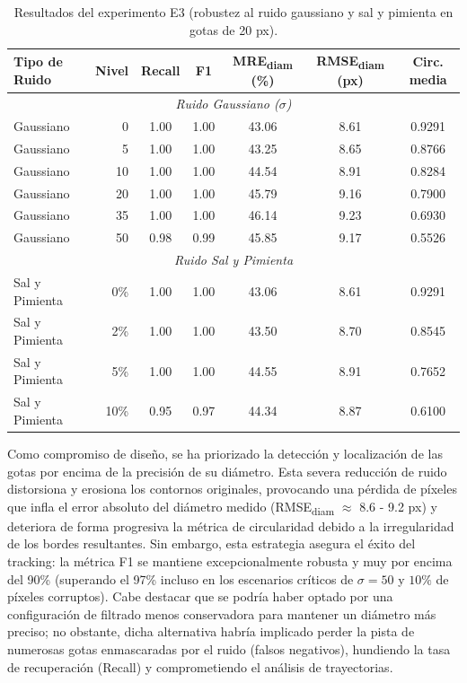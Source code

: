 \begin{table}[H]
\centering
\small
\caption{Resultados del experimento E3 (robustez al ruido gaussiano y sal y pimienta en gotas de 20 px).}
\begin{tabular}{lrccccc}
\hline
\textbf{Tipo de Ruido} & \textbf{Nivel} & \textbf{Recall} & \textbf{F1} & \textbf{MRE\textsubscript{diam} (\%)} & \textbf{RMSE\textsubscript{diam} (px)} & \textbf{Circ. media} \\
\hline
\multicolumn{7}{c}{\textit{Ruido Gaussiano ($\sigma$)}} \\
\hline
Gaussiano & 0  & 1.00 & 1.00 & 43.06 & 8.61 & 0.9291 \\
Gaussiano & 5  & 1.00 & 1.00 & 43.25 & 8.65 & 0.8766 \\
Gaussiano & 10 & 1.00 & 1.00 & 44.54 & 8.91 & 0.8284 \\
Gaussiano & 20 & 1.00 & 1.00 & 45.79 & 9.16 & 0.7900 \\
Gaussiano & 35 & 1.00 & 1.00 & 46.14 & 9.23 & 0.6930 \\
Gaussiano & 50 & 0.98 & 0.99 & 45.85 & 9.17 & 0.5526 \\
\hline
\multicolumn{7}{c}{\textit{Ruido Sal y Pimienta}} \\
\hline
Sal y Pimienta & 0\%  & 1.00 & 1.00 & 43.06 & 8.61 & 0.9291 \\
Sal y Pimienta & 2\%  & 1.00 & 1.00 & 43.50 & 8.70 & 0.8545 \\
Sal y Pimienta & 5\%  & 1.00 & 1.00 & 44.55 & 8.91 & 0.7652 \\
Sal y Pimienta & 10\% & 0.95 & 0.97 & 44.34 & 8.87 & 0.6100 \\
\hline
\end{tabular}
\label{tab:e3_resultados}
\end{table}

Como compromiso de diseño, se ha priorizado la detección y localización de las gotas por encima de la precisión de su diámetro. Esta severa reducción de ruido distorsiona y erosiona los contornos originales, provocando una pérdida de píxeles que infla el error absoluto del diámetro medido (RMSE\textsubscript{diam} $\approx$ 8.6 - 9.2 px) y deteriora de forma progresiva la métrica de circularidad debido a la irregularidad de los bordes resultantes. Sin embargo, esta estrategia asegura el éxito del tracking: la métrica F1 se mantiene excepcionalmente robusta y muy por encima del 90\% (superando el 97\% incluso en los escenarios críticos de $\sigma=50$ y $10\%$ de píxeles corruptos). Cabe destacar que se podría haber optado por una configuración de filtrado menos conservadora para mantener un diámetro más preciso; no obstante, dicha alternativa habría implicado perder la pista de numerosas gotas enmascaradas por el ruido (falsos negativos), hundiendo la tasa de recuperación (Recall) y comprometiendo el análisis de trayectorias.


